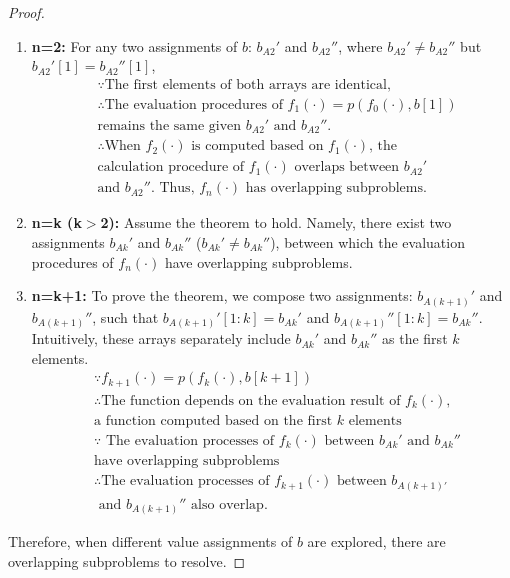 \begin{proof}
\begin{enumerate}
    \item \textbf{n=2:} For any two  assignments of $b$: $b_{A2}'$ and $b_{A2}''$, where $b_{A2}'\neq b_{A2}''$ but $b_{A2}'[1]=b_{A2}''[1]$, 
\begin{align}
    & \because \text{The first elements of both arrays are identical,}\nonumber\\
    & \therefore \text{The evaluation procedures of }
    f_1(\cdot)=p(f_0(\cdot), b[1]) \nonumber\\
    &\text{remains the same given $b_{A2}'$ and $b_{A2}''$. } \nonumber\\
    & \therefore \text{When $f_2(\cdot)$ is computed based on $f_1(\cdot)$, the } \nonumber\\
    & \text{calculation procedure of $f_1(\cdot)$ overlaps between $b_{A2}'$ } \nonumber\\
    &\text{and $b_{A2}''$. Thus, $f_n(\cdot)$ has overlapping subproblems.} \nonumber
\end{align}
    \item \textbf{n=k (k$>$2):} Assume the theorem to hold. Namely, there exist two assignments $b_{Ak}'$ and $b_{Ak}''$ ($b_{Ak}'\neq b_{Ak}''$), between which the evaluation procedures of  $f_n(\cdot)$ have overlapping subproblems. 
    \item \textbf{n=k+1:} To prove the theorem, we compose two assignments: $b_{A(k+1)}'$ and $b_{A(k+1)}''$, such that $b_{A(k+1)}'[1:k]=b_{Ak}'$ and $b_{A(k+1)}''[1:k]=b_{Ak}''$. %
    Intuitively, these arrays separately include $b_{Ak}'$ and $b_{Ak}''$ as the first $k$ elements.  
\begin{align}
    & \because f_{k+1}(\cdot)=p(f_{k}(\cdot), b[k+1]) \nonumber \\
   & \therefore \text{The function depends on the evaluation result of $f_{k}(\cdot)$,}\nonumber\\
   & \text{a function computed based on the first $k$ elements} \nonumber \\
   & \because \text{ The evaluation processes of $f_k(\cdot)$ between $b_{Ak}'$ and $b_{Ak}''$} \nonumber \\
   & \text{have overlapping subproblems} \nonumber \\
   & \therefore \text{The evaluation processes of $f_{k+1}(\cdot)$ between $b_{A(k+1)'}$}\nonumber \\
   &\text{ and $b_{A(k+1)}''$ also overlap.} \nonumber 
\end{align}    
\end{enumerate}
Therefore, when different value assignments of $b$ are explored, there are overlapping subproblems to resolve. 
\end{proof}

